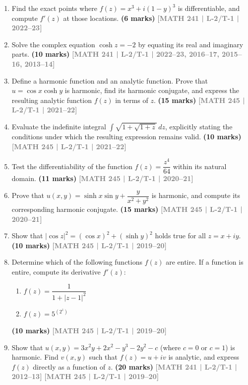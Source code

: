 \documentclass[12pt,a3paper]{article}
\newcommand{\yr}[1]{\hfill\textcolor{gray}{\small\textbf{[#1]}}}
\newcommand{\mk}[1]{\textcolor{orange!70!black}{\small\textbf{(#1 marks)}}}
\begin{document}
\begin{enumerate}
\item Find the exact points where $f(z)=x^{3}+i(1-y)^{3}$ is differentiable, and compute $f'(z)$ at those locations.
\mk{6} \yr{MATH 241 | L-2/T-1 | 2022--23}

\item Solve the complex equation $\cosh z=-2$ by equating its real and imaginary parts.
\mk{10} \yr{MATH 241 | L-2/T-1 | 2022--23, 2016--17, 2015--16, 2013--14}

\item Define a harmonic function and an analytic function. Prove that $u=\cos x\cosh y$ is harmonic, find its harmonic conjugate, and express the resulting analytic function $f(z)$ in terms of $z$.
\mk{15} \yr{MATH 245 | L-2/T-1 | 2021--22}

\item Evaluate the indefinite integral $\displaystyle\int\sqrt{1+\sqrt{1+z}}\,dz$, explicitly stating the conditions under which the resulting expression remains valid.
\mk{10} \yr{MATH 245 | L-2/T-1 | 2021--22}

\item Test the differentiability of the function $f(z)=\dfrac{z^{4}}{64}$ within its natural domain.
\mk{11} \yr{MATH 245 | L-2/T-1 | 2020--21}

\item Prove that $u(x,y)=\sinh x\sin y+\dfrac{y}{x^{2}+y^{2}}$ is harmonic, and compute its corresponding harmonic conjugate.
\mk{15} \yr{MATH 245 | L-2/T-1 | 2020--21}

\item Show that $|\cos z|^{2}=(\cos x)^{2}+(\sinh y)^{2}$ holds true for all $z=x+iy$.
\mk{10} \yr{MATH 245 | L-2/T-1 | 2019--20}

\item Determine which of the following functions $f(z)$ are entire. If a function is entire, compute its derivative $f'(z)$:
\begin{enumerate}
  \item $f(z)=\dfrac{1}{1+|z-1|^{2}}$
  \item $f(z)=5^{(2^{z})}$
\end{enumerate}
\mk{10} \yr{MATH 245 | L-2/T-1 | 2019--20}




\item Show that $u(x,y)=3x^{2}y+2x^{2}-y^{3}-2y^{2}-c$ (where $c=0$ or $c=1$) is harmonic. Find $v(x,y)$ such that $f(z)=u+iv$ is analytic, and express $f(z)$ directly as a function of $z$.
\mk{20} \yr{MATH 241 | L-2/T-1 | 2012--13} \yr{MATH 245 | L-2/T-1 | 2019--20}




\end{enumerate}
\end{document}
